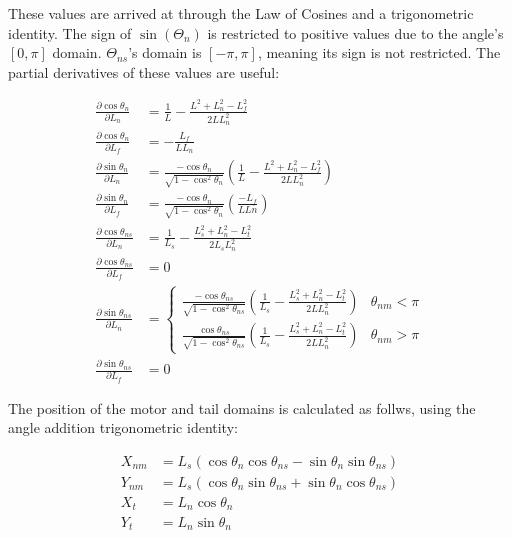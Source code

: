 \documentclass[10pt]{article} %
\begin{document}
These values are arrived at through the Law of Cosines and a trigonometric identity. The sign of $\sin\left(\Theta_n\right)$ is restricted to positive values due to the angle's $[0,\pi]$ domain. $\Theta_{ns}$'s domain is $[-\pi,\pi]$, meaning its sign is not restricted. The partial derivatives of these values are useful:

\begin{align}
  \frac{\partial \cos\theta_n}{\partial L_n} &= \frac{1}{L} - \frac{L^2 + L_n^2 - L_f^2}{2L L_n^2}\\
  \frac{\partial \cos\theta_n}{\partial L_f} &= -\frac{L_f}{LL_n}\\
  \frac{\partial \sin\theta_n}{\partial L_n} &= \frac{-\cos\theta_n}{\sqrt{1-\cos^2\theta_n}}
  \left(\frac{1}{L} - \frac{L^2 + L_n^2 - L_f^2}{2L L_n^2}\right)\\
  \frac{\partial \sin\theta_n}{\partial L_f} &= \frac{-\cos\theta_n}{\sqrt{1-\cos^2\theta_n}}
  \left(\frac{-L_f}{LLn}\right)\\
  \frac{\partial \cos\theta_{ns}}{\partial L_n} &= \frac{1}{L_s}
  - \frac{L_s^2 + L_n^2 - L_t^2}{2L_sL_n^2}\\
  \frac{\partial \cos\theta_{ns}}{\partial L_f} &= 0\\
  \frac{\partial \sin\theta_{ns}}{\partial L_n} &=
  \begin{cases}
    \frac{-\cos\theta_{ns}}{\sqrt{1-\cos^2\theta_{ns}}}
    \left(\frac{1}{L_s} - \frac{L_s^2+L_n^2-L_t^2}{2LL_n^2}\right) & \theta_{nm} < \pi \\
    \frac{\cos\theta_{ns}}{\sqrt{1-\cos^2\theta_{ns}}}
    \left(\frac{1}{L_s} - \frac{L_s^2+L_n^2-L_t^2}{2LL_n^2}\right) & \theta_{nm} > \pi
  \end{cases}\\
  \frac{\partial \sin\theta_{ns}}{\partial L_f} &= 0
\end{align}

The position of the motor and tail domains is calculated as follws, using the angle addition trigonometric identity:

\begin{align}
  X_{nm} &= L_s\left(
  \cos\theta_n\cos\theta_{ns} - \sin\theta_n\sin\theta_{ns}
  \right)
  \\
  Y_{nm} &= L_s\left(
  \cos\theta_n\sin\theta_{ns} + \sin\theta_n\cos\theta_{ns}
  \right)
  \\
  X_{t} &= L_n\cos\theta_n\\
  Y_{t} &= L_n\sin\theta_n\\
\end{align}
\end{document}
